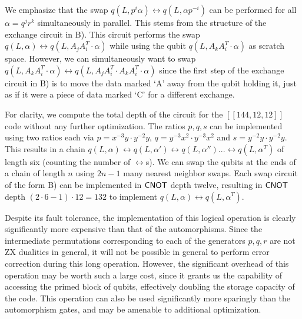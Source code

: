\documentclass{article}
\begin{document}
We emphasize that the swap $q(L,p^i \alpha) \leftrightarrow q(L,\alpha p^{-i})$ can be performed for all $\alpha = q^j r^k$ simultaneously in parallel. This stems from the structure of the exchange circuit in  B). This circuit performs the swap $q(L,\alpha) \leftrightarrow q(L,A_jA_i^T \cdot \alpha)$ while using the qubit $q(L,A_kA_i^T \cdot \alpha)$ as scratch space. However, we can simultaneously want to swap $q(L,A_kA_i^T \cdot \alpha) \leftrightarrow q(L,A_jA_i^T\cdot A_kA_i^T \cdot \alpha)$ since the first step of the exchange circuit in  B) is to move the data marked `A' away from the qubit holding it, just as if it were a piece of data marked `C' for a different exchange.

For clarity, we compute the total depth of the circuit for the $[[144,12,12]]$ code without any further optimization. The ratios $p,q,s$ can be implemented using two ratios each via $p = x^{-3} y \cdot y^{-2} y$,   $q = y^{-3}x^2 \cdot y^{-3}x^2$ and $s = y^{-2} y \cdot y^{-2} y$. This results in a chain $q(L,\alpha) \leftrightarrow q(L, \alpha')\leftrightarrow q(L, \alpha'') ... \leftrightarrow   q(L,\alpha^T)$ of length six (counting the number of $\leftrightarrow$s). We can swap the qubits at the ends of a chain of length $n$ using $2n{-}1$ many nearest neighbor swaps. Each swap circuit of the form  B) can be implemented in $\mathsf{CNOT}$ depth twelve, resulting in $\mathsf{CNOT}$ depth $(2\cdot 6 -1)\cdot 12 = 132$ to implement $q(L,\alpha  ) \leftrightarrow q(L,\alpha^T)$. 



Despite its fault tolerance, the implementation of this logical operation is clearly significantly more expensive than that of the automorphisms. Since the intermediate permutations corresponding to each of the generators $p,q,r$ are not ZX dualities in general, it will not be possible in general to perform error correction during this long operation. However, the significant overhead of this operation may be worth such a large cost, since it grants us the capability of accessing the primed block of qubits, effectively doubling the storage capacity of the code. This operation can also be used significantly more sparingly than the automorphism gates, and may be amenable to additional optimization. 
\end{document}
